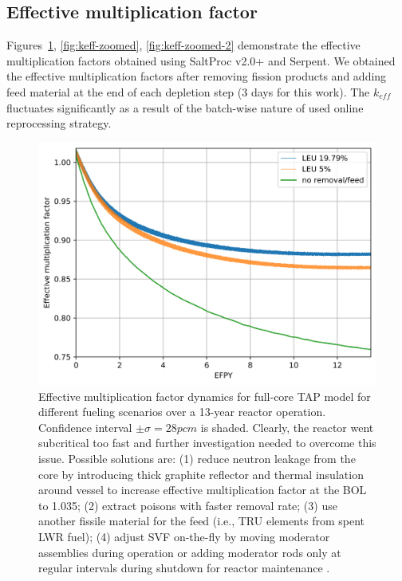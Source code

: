 \documentclass[12pt]{article} %
\begin{document}
\subsection{Effective multiplication factor}
Figures~\ref{fig:keff}, \ref{fig:keff-zoomed}, \ref{fig:keff-zoomed-2} demonstrate 
the effective 
multiplication factors  obtained using SaltProc v2.0+ and Serpent. We obtained 
the effective multiplication factors after removing fission products 
and adding feed material at the end of each depletion step (3 days for this 
work). The $k_{eff}$ fluctuates significantly as a result of the batch-wise 
nature of used online reprocessing strategy.
\begin{figure}[htp!] %
		  \includegraphics[width=1.05\textwidth]{keff_3.png}
	\vspace{-0.2in}
  \caption{Effective multiplication factor dynamics for full-core
   \gls{TAP} model for different fueling scenarios over a 13-year reactor operation. 
   Confidence interval $\pm\sigma=28pcm$ is shaded. Clearly, the reactor went 
   subcritical too fast and further investigation needed to overcome this issue. 
   Possible solutions are: (1) reduce neutron leakage from the core by 
   introducing thick graphite reflector and thermal insulation around 
   vessel to increase effective multiplication factor at the 
   \gls{BOL} to 1.035; (2) extract poisons with faster removal rate;
   (3) use another fissile material for the feed (i.e., \gls{TRU} elements from spent 
   \gls{LWR} fuel); (4) adjust \gls{SVF} on-the-fly by 
   moving moderator assemblies during operation 
   \cite{transatomic_power_corporation_technical_2016} or adding moderator rods 
   only at regular intervals during shutdown for reactor maintenance  \cite{betzler_fuel_2018}.}
  \label{fig:keff}
\end{figure}
\end{document}
